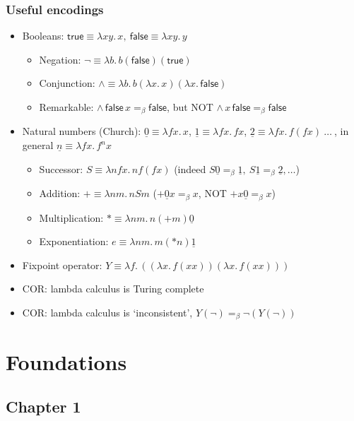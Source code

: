 \documentclass[handout]{beamer}
\newcommand{\lam}[2]{\lambda{#1.\,#2}}
\newcommand{\cnum}[1]{\underline{#1}}
\newcommand{\tru}{\mathsf{true}}
\newcommand{\fal}{\mathsf{false}}
\begin{document}
\frame
  {
  
    \frametitle{Useful encodings}

    \begin{itemize}[<+->]
    \item Booleans: $\tru \equiv \lam{x y}{x},~\fal \equiv \lam{x y}{y}$
        \begin{itemize}[<+->]
        \item Negation:  $\neg \equiv \lam{b}{b(\fal)(\tru)}$
        \item Conjunction:  $\wedge \equiv \lam{b}{b(\lam{x}{x})(\lam{x}{\fal})}$
        \item Remarkable:  $\wedge\,\fal\,x =_\beta \fal$, but NOT $\wedge\,x\,\fal =_\beta \fal$
        \end{itemize}
    \item Natural numbers (Church): 
    $\cnum{0}\equiv \lam{f x}{x}$, $\cnum{1}\equiv \lam{f x}{fx}$,
    $\cnum{2}\equiv \lam{fx}{f(fx)}~\ldots~$, in general $\cnum{n}\equiv \lam{fx}{f^n x}$
        \begin{itemize}[<+->]
        \item Successor: ${{S}}\equiv \lam{nfx}{nf(fx)}$
                 (indeed $S\cnum{0}=_\beta \cnum{1},~S\cnum{1}=_\beta \cnum{2},\ldots$)
        \item Addition: ${{+}}\equiv \lam{nm}{nSm}$ ($+\cnum{0}x=_\beta x$, NOT $+x\cnum{0}=_\beta x$)
        \item Multiplication: ${{*}}\equiv \lam{nm}{n({{+}}m)\cnum{0}}$
        \item Exponentiation: ${{e}}\equiv \lam{nm}{m({{*}}n)\cnum{1}}$
        \end{itemize}
    \item Fixpoint operator: $Y \equiv \lam{f}{((\lam{x}{f(xx)})(\lam{x}{f(xx)}))}$
    \item COR: lambda calculus is Turing complete
    \item COR: lambda calculus is `inconsistent', $Y(\neg)=_\beta \neg(Y(\neg))$
    \end{itemize}
  }

  \section{Foundations}
  \subsection{Chapter 1}
\end{document}
